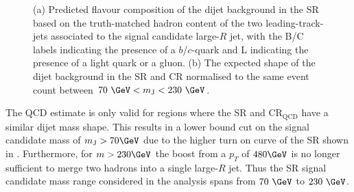 \begin{figure}[!htbp]
\centering
{}\hfill
{}

\caption{\cite{ATLAS-CONF-2018-052} (a) Predicted flavour composition of the dijet background in the SR based on the truth-matched hadron content of the two leading-\pt track-jets associated to the signal candidate large-$R$ jet, with the B/C labels indicating the presence of a $b$/$c$-quark and L indicating the presence of a light quark or a gluon. (b) The expected shape of the dijet background in the SR and CR normalised to the same event count between $70~\GeV < m_{\text{J}} < 230~\GeV$.}
\label{fig:event_selection}
\end{figure}

The QCD estimate is only valid for regions where the SR and
$\text{CR}_{\text{QCD}}$ have a similar dijet mass shape.  This results in a
lower bound cut on the signal candidate mass of $m_{\text{J}} > 70\GeV$ due to
the higher turn on curve of the SR shown in .
Furthermore, for $m > 230\GeV$ the boost from a $p_{T}$ of $480\GeV$ is no
longer sufficient to merge two hadrons into a single large-$R$ jet.  Thus the
SR signal candidate mass range considered in the analysis spans from $70~\GeV$
to $230~\GeV$.

